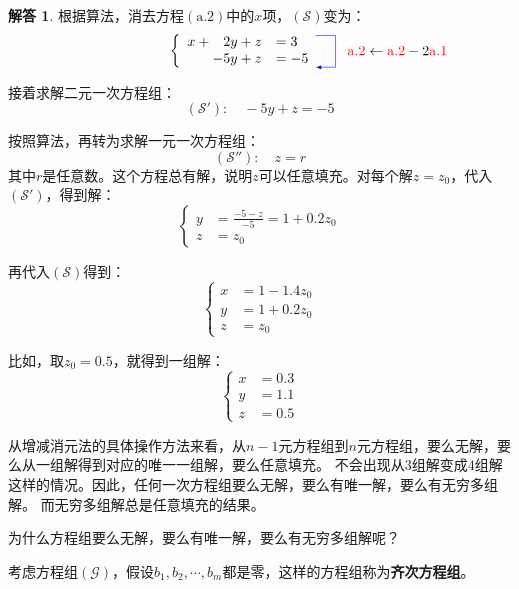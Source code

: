 \documentclass[12pt,UTF8]{ctexbook}
\theoremstyle{definition}
\newtheorem*{so}{解答}
\theoremstyle{plain}
\begin{document}
\begin{so}
根据算法，消去方程$(\mathrm{a}.2)$中的$x$项，$(\mathcal{S})$变为：
$$ \qquad \qquad \qquad \qquad\qquad \left\{
    \begin{array}{rl}
x + \phantom{-}2y + z &= 3 \\
 - 5y + z &= -5  
\end{array}
\begin{tikzpicture}[baseline={([yshift=-.5ex]current bounding box.center)},>=latex]
    \draw[color=blue, ->] (.5,.4)--(1.0, .4)--(1.0,-.4)--(.5, -.4);
    \node[text width=3.4cm] at (3, 0.0) {${{\color{red}\mathrm{a}.2} \leftarrow {\color{red}\mathrm{a}.2} - 2\color{red}\mathrm{a}.1}$};
  \end{tikzpicture}
\right. $$

接着求解二元一次方程组：
$$ (\mathcal{S}'):\quad  - 5y + z = -5 $$

按照算法，再转为求解一元一次方程组：
$$ (\mathcal{S}''):\quad  z = r $$
其中$r$是任意数。这个方程总有解，说明$z$可以任意填充。对每个解$z = z_0$，代入$(\mathcal{S}')$，得到解：
$$ \left\{
    \begin{array}{rl}
        y &=\frac{-5 - z}{-5} = 1 + 0.2 z_0 \\
        z &= z_0 
    \end{array}
\right. $$

再代入$(\mathcal{S})$得到：
$$ \left\{
    \begin{array}{rl}
        x &= 1 - 1.4 z_0 \\
        y &= 1 + 0.2 z_0\\
        z &= z_0
    \end{array}
\right. $$

比如，取$z_0 = 0.5$，就得到一组解：
$$ \left\{
    \begin{array}{rl}
        x &= 0.3  \\
        y &= 1.1 \\
        z &= 0.5 
    \end{array}
\right. $$
    
\end{so}

从增减消元法的具体操作方法来看，从$n-1$元方程组到$n$元方程组，要么无解，要么从一组解得到对应的唯一一组解，要么任意填充。
不会出现从$3$组解变成$4$组解这样的情况。因此，任何一次方程组要么无解，要么有唯一解，要么有无穷多组解。
而无穷多组解总是任意填充的结果。

为什么方程组要么无解，要么有唯一解，要么有无穷多组解呢？

考虑方程组$(\mathcal{G})$，假设$b_1, b_2,\cdots, b_m$都是零，这样的方程组称为\textbf{齐次方程组}。
\end{document}
